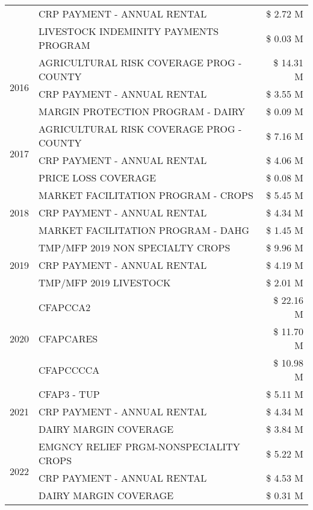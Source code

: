 \begin{tabular}{llr}
 & CRP PAYMENT - ANNUAL RENTAL & \$ 2.72 M \\
 & LIVESTOCK INDEMINITY PAYMENTS PROGRAM & \$ 0.03 M \\
\cline{1-3}
\multirow[t]{3}{*}{2016} & AGRICULTURAL RISK COVERAGE PROG - COUNTY & \$ 14.31 M \\
 & CRP PAYMENT - ANNUAL RENTAL & \$ 3.55 M \\
 & MARGIN PROTECTION PROGRAM - DAIRY & \$ 0.09 M \\
\cline{1-3}
\multirow[t]{3}{*}{2017} & AGRICULTURAL RISK COVERAGE PROG - COUNTY & \$ 7.16 M \\
 & CRP PAYMENT - ANNUAL RENTAL & \$ 4.06 M \\
 & PRICE LOSS COVERAGE & \$ 0.08 M \\
\cline{1-3}
\multirow[t]{3}{*}{2018} & MARKET FACILITATION PROGRAM - CROPS & \$ 5.45 M \\
 & CRP PAYMENT - ANNUAL RENTAL & \$ 4.34 M \\
 & MARKET FACILITATION PROGRAM - DAHG & \$ 1.45 M \\
\cline{1-3}
\multirow[t]{3}{*}{2019} & TMP/MFP 2019 NON SPECIALTY CROPS & \$ 9.96 M \\
 & CRP PAYMENT - ANNUAL RENTAL & \$ 4.19 M \\
 & TMP/MFP 2019 LIVESTOCK & \$ 2.01 M \\
\cline{1-3}
\multirow[t]{3}{*}{2020} & CFAPCCA2 & \$ 22.16 M \\
 & CFAPCARES & \$ 11.70 M \\
 & CFAPCCCCA & \$ 10.98 M \\
\cline{1-3}
\multirow[t]{3}{*}{2021} & CFAP3 - TUP & \$ 5.11 M \\
 & CRP PAYMENT - ANNUAL RENTAL & \$ 4.34 M \\
 & DAIRY MARGIN COVERAGE & \$ 3.84 M \\
\cline{1-3}
\multirow[t]{3}{*}{2022} & EMGNCY RELIEF PRGM-NONSPECIALITY CROPS & \$ 5.22 M \\
 & CRP PAYMENT - ANNUAL RENTAL & \$ 4.53 M \\
 & DAIRY MARGIN COVERAGE & \$ 0.31 M \\
\cline{1-3}
\bottomrule
\end{tabular}
